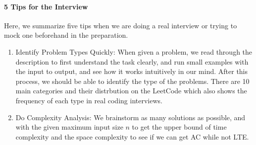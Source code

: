 \documentclass[../main.tex]{subfiles}
\begin{document}
\paragraph{5 Tips for the Interview}
Here, we summarize five tips when we are doing a real interview or trying to mock one beforehand in the preparation. 
\begin{enumerate}
\item{Identify Problem Types Quickly:}
When given a problem, we read through the description to first understand the task clearly, and run small examples with the input to output, and see how it works intuitively in our mind. After this process, we should be able to identify the type of the problems. There are 10 main categories and their distrbution on the LeetCode which also shows the frequency of each type in real coding interviews. 
\begin{table}[h]
\label{tab: 1o_categories}
\centering
\noindent{}
\end{table}

\item{Do Complexity Analysis:}
We brainstorm as many solutions as possible, and with the given maximum input size $n$ to get the upper bound of time complexity and the space complexity to see if we can get AC while not LTE. 


\end{enumerate}
\end{document}
